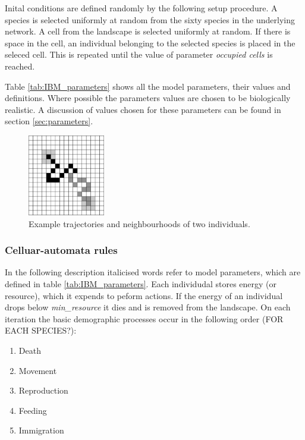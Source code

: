 Inital conditions are defined randomly by the following setup procedure. A species is selected uniformly at random from the sixty species in the underlying network. A cell from the landscape is selected uniformly at random. If there is space in the cell, an individual belonging to the selected species is placed in the seleced cell. This is repeated until the value of parameter \emph{occupied cells} is reached.  

Table \ref{tab:IBM_parameters} shows all the model parameters, their values and definitions. Where possible the parameters values are chosen to be biologically realistic. A discussion of values chosen for these parameters can be found in section \ref{sec:parameters}. 






\begin{figure}
	\centering
	\includegraphics[width=0.3\textwidth]{"diagrams/IBM_movement"}
	\caption{Example trajectories and neighbourhoods of two individuals.}
	\label{fig:IBM_motion}
\end{figure}


\subsubsection{Celluar-automata rules}
\label{sec:CA_rules}

In the following description italicised words refer to model parameters, which are defined in table \ref{tab:IBM_parameters}. Each individudal stores energy (or resource), which it expends to peform actions. If the energy of an individual drops below \emph{min\_resource} it dies and is removed from the landscape. On each iteration the basic demographic processes occur in the following order  (FOR EACH SPECIES?):

\begin{enumerate}
	\item Death
	\item Movement
	\item Reproduction
	\item Feeding
	\item Immigration
\end{enumerate}

